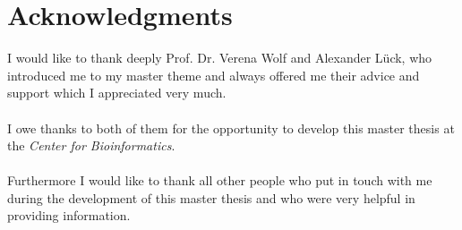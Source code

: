 \section*{Acknowledgments}
I would like to thank deeply Prof. Dr. Verena Wolf and Alexander L\"{u}ck, who introduced me to my master theme and always offered me their advice and support which I appreciated very much.\\
\\
I owe thanks to both of them for the opportunity to develop this master thesis at the \textit{Center for Bioinformatics}.\\
\\
Furthermore I would like to thank all other people who put in touch with me during the development of this master thesis and who were very helpful in providing information.